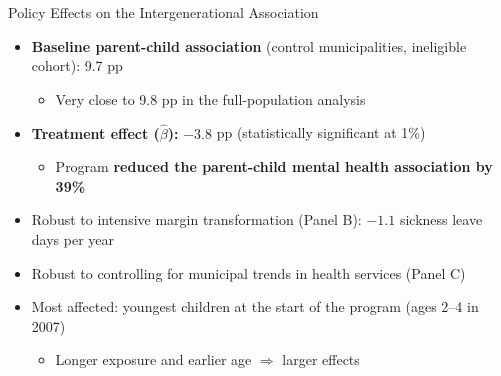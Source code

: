 \documentclass[aspectratio=169]{beamer}
\begin{document}
\begin{frame}{Policy Effects on the Intergenerational Association}
  \begin{itemize}
    \item \textbf{Baseline parent-child association} (control municipalities, ineligible cohort): 9.7 pp
    \begin{itemize}
      \item Very close to 9.8 pp in the full-population analysis
    \end{itemize}
    \item \textbf{Treatment effect ($\hat\beta$):} $-3.8$ pp (statistically significant at 1\%)
    \begin{itemize}
      \item Program \textbf{reduced the parent-child mental health association by 39\%}
    \end{itemize}
    \item Robust to intensive margin transformation (Panel B): $-1.1$ sickness leave days per year
    \item Robust to controlling for municipal trends in health services (Panel C)
    \item Most affected: youngest children at the start of the program (ages 2--4 in 2007)
    \begin{itemize}
      \item Longer exposure and earlier age $\Rightarrow$ larger effects
    \end{itemize}
  \end{itemize}
\end{frame}
\end{document}
